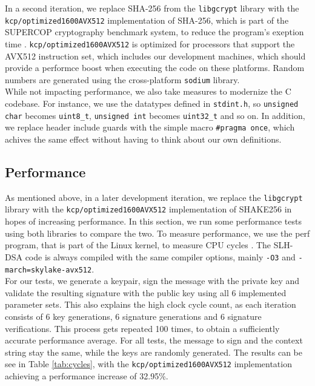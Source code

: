 \documentclass[journal=tosc,notanonymous]{iacrtrans}
\begin{document}
In a second iteration, we replace SHA-256 from the \texttt{libgcrypt} library with the \texttt{kcp/optimized1600AVX512} implementation of SHA-256, which is part of the SUPERCOP cryptography benchmark system, to reduce the program's exeption time \cite{SUPERCOP-2024}.
\texttt{kcp/optimized1600AVX512} is optimized for processors that support the AVX512 instruction set, which includes our development machines, which should provide a performce boost when executing the code on these platforms.
Random numbers are generated using the cross-platform \texttt{sodium} library.
\\
While not impacting performance, we also take measures to modernize the C codebase.
For instance, we use the datatypes defined in \texttt{stdint.h}, so \texttt{unsigned char} becomes \texttt{uint8\_t}, \texttt{unsigned int} becomes \texttt{uint32\_t} and so on.
In addition, we replace header include guards with the simple macro \texttt{\#pragma once}, which achives the same effect without having to think about our own definitions.


\subsection{Performance}

As mentioned above, in a later development iteration, we replace the \texttt{libgcrypt} library with the \texttt{kcp/optimized1600AVX512} implementation of SHAKE256 in hopes of increasing performance.
In this section, we run some performance tests using both libraries to compare the two.
To measure performance, we use the perf program, that is part of the Linux kernel, to measure CPU cycles \cite{perf-2024}.
The SLH-DSA code is always compiled with the same compiler options, mainly \texttt{-O3} and \texttt{-march=skylake-avx512}.
\\
For our tests, we generate a keypair, sign the message with the private key and validate the resulting signature with the public key using all 6 implemented parameter sets.
This also explains the high clock cycle count, as each iteration consists of 6 key generations, 6 signature generations and 6 signature verifications.
This process gets repeated 100 times, to obtain a sufficiently accurate performance average.
For all tests, the message to sign and the context string stay the same, while the keys are randomly generated.
The results can be see in Table \ref{tab:cycles}, with the \texttt{kcp/optimized1600AVX512} implementation achieving a performance increase of 32.95\%.
\end{document}
